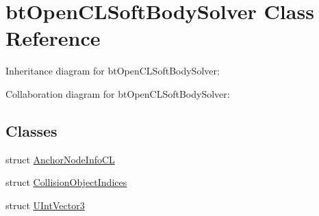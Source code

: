 \hypertarget{classbt_open_c_l_soft_body_solver}{\section{bt\+Open\+C\+L\+Soft\+Body\+Solver Class Reference}
\label{classbt_open_c_l_soft_body_solver}
}


Inheritance diagram for bt\+Open\+C\+L\+Soft\+Body\+Solver\+:


Collaboration diagram for bt\+Open\+C\+L\+Soft\+Body\+Solver\+:
\subsection*{Classes}
\begin{DoxyCompactItemize}
\item 
struct \hyperlink{structbt_open_c_l_soft_body_solver_1_1_anchor_node_info_c_l}{Anchor\+Node\+Info\+C\+L}
\item 
struct \hyperlink{structbt_open_c_l_soft_body_solver_1_1_collision_object_indices}{Collision\+Object\+Indices}
\item 
struct \hyperlink{structbt_open_c_l_soft_body_solver_1_1_u_int_vector3}{U\+Int\+Vector3}
\end{DoxyCompactItemize}
